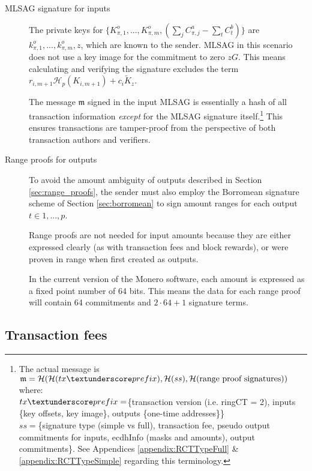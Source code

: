 \begin{description}
	
	\item [MLSAG signature for inputs]
	The private keys for 
	\(\{K_{\pi,1}^o,...,K_{\pi,m}^o, (\sum\limits_j C_{\pi, j}^a - \sum\limits_t C^b_{t})\}\)
	are \(k_{\pi,1}^o,...,k_{\pi,m}^o, z\), which are known to the sender. 
	MLSAG in this scenario does not use a key image for the commitment to zero $z G$. This means calculating and verifying the signature excludes the term $r_{i,m+1} \mathcal{H}_p(K_{i,m+1}) + c_i \tilde{K}_z$.
	
	The message $\mathfrak{m}$ signed in the input MLSAG is essentially a hash of all transaction information {\em except} for the MLSAG signature itself.\footnote{\label{MLSAG_message}The actual message is $\mathfrak{m} = \mathcal{H}(\mathcal{H}(tx\textunderscore prefix),\mathcal{H}(ss),\mathcal{H}(\text{range proof signatures}))$ where:\\
	$tx\textunderscore prefix = $\{transaction version (i.e. ringCT = 2), inputs \{key offsets, key image\}, outputs \{one-time addresses\}\}\\ 
	$ss = $\{signature type (simple vs full), transaction fee, pseudo output commitments for inputs, ecdhInfo (masks and amounts), output commitments\}. See Appendices \ref{appendix:RCTTypeFull} \& \ref{appendix:RCTTypeSimple} regarding this terminology.} This ensures transactions are tamper-proof from the perspective of both transaction authors and verifiers.
	
	\item[Range proofs for outputs]
	To avoid the amount ambiguity of outputs described in Section  \ref{sec:range_proofs}, the sender must also employ the Borromean signature scheme of Section \ref{sec:borromean} to sign amount ranges for each output $t \in {1, ..., p}$.
	
	Range proofs are not needed for input amounts because they are either expressed clearly (as with transaction fees and block rewards), or were proven in range when first created as outputs.
	
	In the current version of the Monero software, each amount is expressed as a fixed point number of 64 bits. This means the data for each range proof will contain 64 commitments and $2 \cdot 64 + 1$ signature terms.
	
\end{description}


\subsection{Transaction fees}

